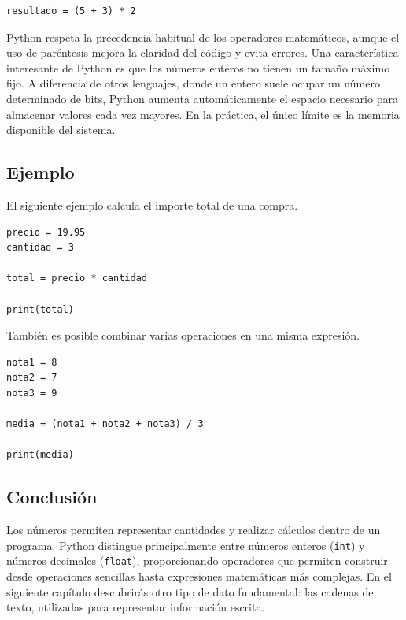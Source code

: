 \documentclass[11pt,a5paper,twoside]{book}
\begin{document}
\begin{tcolorbox}
\scriptsize
 \begin{verbatim}
resultado = (5 + 3) * 2
\end{verbatim}
\end{tcolorbox}
Python respeta la precedencia habitual de los operadores matemáticos, aunque el uso de paréntesis mejora la claridad del código y evita errores.
Una característica interesante de Python es que los números enteros no tienen un tamaño máximo fijo. A diferencia de otros lenguajes, donde un entero suele ocupar un número determinado de bits, Python aumenta automáticamente el espacio necesario para almacenar valores cada vez mayores. En la práctica, el único límite es la memoria disponible del sistema.
\subsection{Ejemplo}
El siguiente ejemplo calcula el importe total de una compra.


\begin{tcolorbox}
\scriptsize
 \begin{verbatim}
precio = 19.95
cantidad = 3

total = precio * cantidad

print(total)
\end{verbatim}
\end{tcolorbox}
También es posible combinar varias operaciones en una misma expresión.


\begin{tcolorbox}
\scriptsize
 \begin{verbatim}
nota1 = 8
nota2 = 7
nota3 = 9

media = (nota1 + nota2 + nota3) / 3

print(media)
\end{verbatim}
\end{tcolorbox}
\subsection{Conclusión}
Los números permiten representar cantidades y realizar cálculos dentro de un programa. Python distingue principalmente entre números enteros ({\scriptsize \texttt{int}}) y números decimales ({\scriptsize \texttt{float}}), proporcionando operadores que permiten construir desde operaciones sencillas hasta expresiones matemáticas más complejas.
En el siguiente capítulo descubrirás otro tipo de dato fundamental: las cadenas de texto, utilizadas para representar información escrita.
\end{document}
